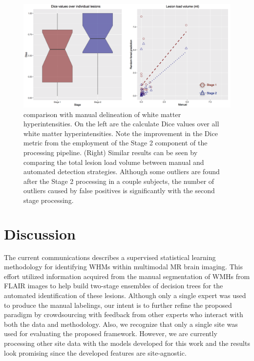 \documentclass[11pt,]{article}
\begin{document}
\begin{figure}[htbp]
\centering
\includegraphics{Figures/llvAndDice.png}
\caption{ comparison with manual delineation of
white matter hyperintensities. On the left are the
calculate Dice values over all white matter
hyperintensities. Note the improvement in the Dice metric from the
employment of the Stage 2 component of the processing pipeline. (Right)
Similar results can be seen by comparing the total lesion load volume
between manual and automated detection strategies. Although some
outliers are found after the Stage 2 processing in a couple subjects,
the number of outliers caused by false positives is
 significantly with the second stage
processing.}
\end{figure}

\section{Discussion}\label{discussion}

The current communications describes a supervised statistical learning
methodology for identifying WHMs within multimodal MR brain imaging.
This effort utilized information acquired from the manual segmentation
of WMHs from FLAIR images to help build two-stage ensembles of decision
trees for the automated identification of these lesions. Although only a
single expert was used to produce the manual labelings, our intent is to
further refine the proposed paradigm by crowdsourcing with feedback from
other experts who interact with both the data and methodology. Also, we
recognize that only a single site was used for evaluating the proposed
framework. However, we are currently processing other site data with the
models developed for this work and the results look promising since the
developed features are site-agnostic.
\end{document}
